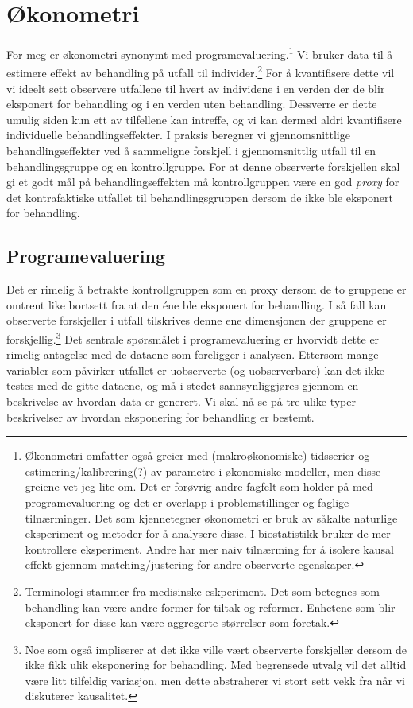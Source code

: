 \chapter{Økonometri}
For meg er økonometri synonymt med programevaluering.\footnote{Økonometri omfatter også greier med (makroøkonomiske) tidsserier og estimering/kalibrering(?) av parametre i økonomiske modeller, men disse greiene vet jeg lite om. Det er forøvrig andre fagfelt som holder på med programevaluering og det er overlapp i problemstillinger og faglige tilnærminger. Det som kjennetegner økonometri er bruk av såkalte naturlige eksperiment og metoder for å analysere disse. I biostatistikk bruker de mer kontrollere eksperiment. Andre har mer naiv tilnærming for å isolere kausal effekt gjennom matching/justering for andre observerte egenskaper.} Vi bruker data til å estimere effekt av behandling på utfall til individer.\footnote{Terminologi stammer fra medisinske eskperiment. Det som betegnes som behandling kan være andre former for tiltak og reformer. Enhetene som blir eksponert for disse kan være aggregerte størrelser som foretak.} For å kvantifisere dette vil vi ideelt sett observere utfallene til hvert av individene i en verden der de blir eksponert for behandling og i en verden uten behandling. Dessverre er dette umulig siden kun ett av tilfellene kan intreffe, og vi kan dermed aldri kvantifisere individuelle behandlingseffekter. I praksis beregner vi gjennomsnittlige behandlingseffekter ved å sammeligne forskjell i gjennomsnittlig utfall til en behandlingsgruppe og en kontrollgruppe. For at denne observerte forskjellen skal gi et godt mål på behandlingseffekten må kontrollgruppen være en god \textit{proxy} for det kontrafaktiske utfallet til behandlingsgruppen dersom de ikke ble eksponert for behandling.
\section{Programevaluering}
Det er rimelig å betrakte kontrollgruppen som en proxy dersom de to gruppene er omtrent like bortsett fra at den éne ble eksponert for behandling. I så fall kan observerte forskjeller i utfall tilskrives denne ene dimensjonen der gruppene er forskjellig.\footnote{Noe som også impliserer at det ikke ville vært observerte forskjeller dersom de ikke fikk ulik eksponering for behandling. Med begrensede utvalg vil det alltid være litt tilfeldig variasjon, men dette abstraherer vi stort sett vekk fra når vi diskuterer kausalitet.} Det sentrale spørsmålet i programevaluering er hvorvidt dette er rimelig antagelse med de dataene som foreligger i analysen. Ettersom mange variabler som påvirker utfallet er uobserverte (og uobserverbare) kan det ikke testes med de gitte dataene, og må i stedet sannsynliggjøres gjennom en beskrivelse av hvordan data er generert. Vi skal nå se på tre ulike typer beskrivelser av hvordan eksponering for behandling er bestemt.

